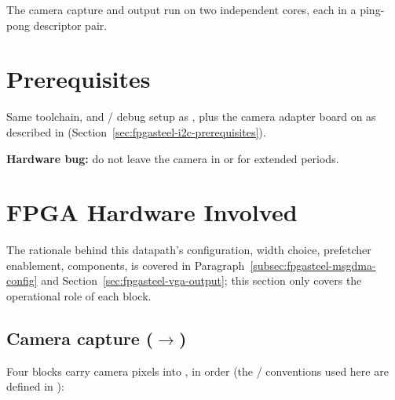 The camera capture and  output run on two independent  cores, each in a ping-pong descriptor pair.

\section{Prerequisites}
\label{sec:fpgasteel-simple-forwarding-prerequisites}

Same toolchain,  and / debug setup as , plus the  camera adapter board on  as described in  (Section~\ref{sec:fpgasteel-i2c-prerequisites}).

\begin{warningbox}
\textbf{Hardware bug:} do not leave the camera in  or  for extended periods.\footnotemark
\end{warningbox}

\section{FPGA Hardware Involved}
\label{sec:fpgasteel-simple-forwarding-hardware}

The rationale behind this datapath's configuration, width choice, prefetcher enablement,  components, is covered in Paragraph~\ref{subsec:fpgasteel-msgdma-config} and Section~\ref{sec:fpgasteel-vga-output}; this section only covers the operational role of each block.

\subsection{Camera capture ($\rightarrow$)}
\label{subsec:fpgasteel-simple-forwarding-camera-capture}

Four blocks carry camera pixels into  , in order (the / conventions used here are defined in \cite{AVALON-SPEC}):

